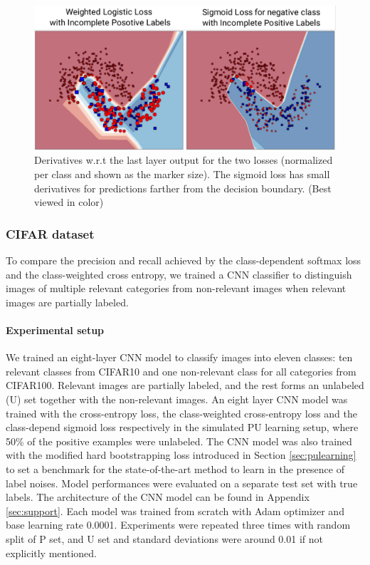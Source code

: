 \begin{figure}[t]
\begin{center}
   \includegraphics[width=\linewidth]{img/moons_diff}
\end{center}
   \caption{
   Derivatives w.r.t the last layer output for the two losses (normalized per class and shown as the marker size).
   The sigmoid loss has small derivatives for predictions farther from the decision boundary.
   (Best viewed in color)
   }
\label{fig:moonsdiff}
\end{figure}



\subsubsection{CIFAR dataset}

To compare the precision and recall achieved by the class-dependent softmax loss and the class-weighted cross entropy, we trained a CNN classifier to distinguish images of multiple relevant categories from non-relevant images when relevant images are partially labeled.

\paragraph{Experimental setup}
We trained an eight-layer CNN model to classify images into eleven classes: ten relevant classes from CIFAR10 and one non-relevant class for all categories from CIFAR100.
Relevant images are partially labeled, and the rest forms an unlabeled (U) set together with the non-relevant images.
An eight layer CNN model was trained with the cross-entropy loss, the class-weighted cross-entropy loss and the class-depend sigmoid loss respectively in the simulated PU learning setup, where 50\% of the positive examples were unlabeled.
The CNN model was also trained with the modified hard bootstrapping loss introduced in Section \ref{sec:pulearning} to set a benchmark for the state-of-the-art method to learn in the presence of label noises.
Model performances were evaluated on a separate test set with true labels.
The architecture of the CNN model can be found in Appendix \ref{sec:support}.
Each model was trained from scratch with Adam optimizer and base learning rate 0.0001.
Experiments were repeated three times with random split of P set, and U set and standard deviations were around 0.01 if not explicitly mentioned.

